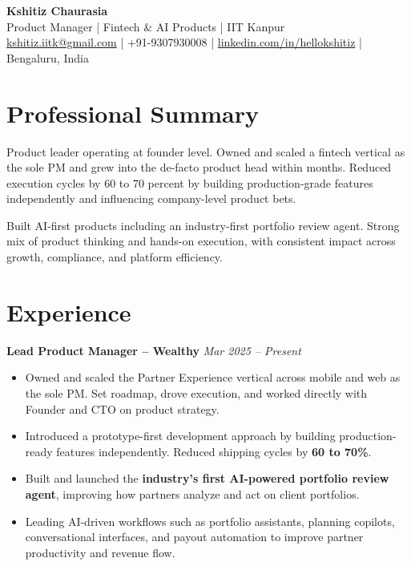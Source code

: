 \documentclass[10pt,a4paper]{article}
\begin{document}
\noindent
{\LARGE \textbf{Kshitiz Chaurasia}}\\
Product Manager | Fintech \& AI Products | IIT Kanpur\\
\href{mailto:kshitiz.iitk@gmail.com}{kshitiz.iitk@gmail.com} | +91-9307930008 | \href{https://linkedin.com/in/hellokshitiz}{linkedin.com/in/hellokshitiz} | Bengaluru, India

\section*{Professional Summary}

Product leader operating at founder level. Owned and scaled a fintech vertical as the sole PM and grew into the de-facto product head within months. Reduced execution cycles by 60 to 70 percent by building production-grade features independently and influencing company-level product bets.

Built AI-first products including an industry-first portfolio review agent. Strong mix of product thinking and hands-on execution, with consistent impact across growth, compliance, and platform efficiency.

\section*{Experience}

\noindent\textbf{Lead Product Manager – Wealthy} \hfill \textit{Mar 2025 – Present}
\vspace{-3pt}
\begin{itemize}
  \item Owned and scaled the Partner Experience vertical across mobile and web as the sole PM. Set roadmap, drove execution, and worked directly with Founder and CTO on product strategy.
  
  \item Introduced a prototype-first development approach by building production-ready features independently. Reduced shipping cycles by \textbf{60 to 70\%}.
  
  \item Built and launched the \textbf{industry’s first AI-powered portfolio review agent}, improving how partners analyze and act on client portfolios.
  
  \item Leading AI-driven workflows such as portfolio assistants, planning copilots, conversational interfaces, and payout automation to improve partner productivity and revenue flow.
\end{itemize}
\end{document}
